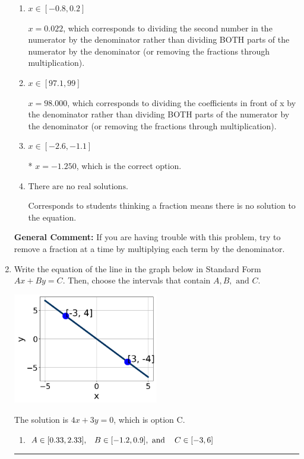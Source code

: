 \documentclass{extbook}[14pt]
\newcommand{\litem}[1]{\item #1

\rule{\textwidth}{0.4pt}}
\begin{document}
\begin{enumerate}
{\begin{enumerate}[label=\Alph*.]
 $x = -37.250$, which corresponds to not distributing the negative in front of the second fraction.
\item \( x \in [-0.8, 0.2] \)

 $x = 0.022$, which corresponds to dividing the second number in the numerator by the denominator rather than dividing BOTH parts of the numerator by the denominator (or removing the fractions through multiplication).
\item \( x \in [97.1, 99] \)

 $x = 98.000$, which corresponds to dividing the coefficients in front of x by the denominator rather than dividing BOTH parts of the numerator by the denominator (or removing the fractions through multiplication).
\item \( x \in [-2.6, -1.1] \)

* $x = -1.250$, which is the correct option.
\item \( \text{There are no real solutions.} \)

Corresponds to students thinking a fraction means there is no solution to the equation.
\end{enumerate}

\textbf{General Comment:} If you are having trouble with this problem, try to remove a fraction at a time by multiplying each term by the denominator.
}
\litem{
Write the equation of the line in the graph below in Standard Form $Ax+By=C$. Then, choose the intervals that contain $A, B, \text{ and } C$.

\begin{center}
    \includegraphics[width=0.5\textwidth]{../Figures/linearGraphToStandardCopyC.png}
\end{center}


The solution is \( 4x + 3y = 0 \), which is option C.\begin{enumerate}[label=\Alph*.]
\item \( A \in [0.33, 2.33], \hspace{3mm} B \in [-1.2, 0.9], \text{ and } \hspace{3mm} C \in [-3, 6] \)


\end{enumerate}}
\end{enumerate}
\end{document}

